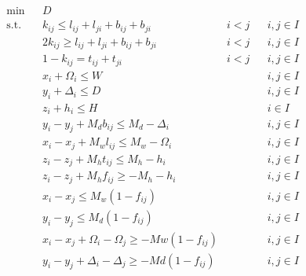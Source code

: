 \begin{align}
	& \underset{}{\text{min}}
	& & D \\
	  & \text{s.t.} &   & k_{ij} \leq l_{ij} + l_{ji} + b_{ij} + b_{ji}                                & i < j    &   & i,j \in I \label{equa53} \\
	  &             &   & 2 k_{ij} \geq l_{ij} + l_{ji} + b_{ij} + b_{ji}                              & i < j    &   & i,j \in I \label{equa54} \\
	  &             &   & 1 - k_{ij} = t_{ij} + t_{ji}                                                 & i < j    &   & i,j \in I \label{equa55} \\
	  &             &   & x_i + \Omega_i \leq W                                                        &          &   & i,j \in I \label{equa56} \\
	  &             &   & y_i + \Delta_i \leq D                                                        &          &   & i,j \in I \label{equa57} \\
	  &             &   & z_i + h_i \leq H                                                             &          &   & i \in I \label{equa58}   \\	
	  &             &   & y_i - y_j + M_d b_{ij} \leq M_d - \Delta_i                                   &          &   & i,j \in I \label{equa59} \\
	  &             &   & x_i - x_j + M_w l_{ij} \leq M_w - \Omega_i                                   &          &   & i,j \in I \label{equa60} \\
	  &             &   & z_i - z_j + M_h t_{ij} \leq M_h - h_i                                        &          &   & i,j \in I \label{equa61} \\
	  &             &   & z_i - z_j + M_h f_{ij} \geq - M_h - h_i                                      &          &   & i,j \in I \label{equa62} \\
	  &             &   & x_i - x_j \leq M_w (1-f_{ij})                                                &          &   & i,j \in I \label{equa63} \\
	  &             &   & y_i - y_j \leq M_d (1-f_{ij})                                                &          &   & i,j \in I \label{equa64} \\
	  &             &   & x_i - x_j + \Omega_i - \Omega_j \geq - Mw(1 - f_{ij})                        &          &   & i,j \in I\label{equa65}  \\
	  &             &   & y_i - y_j + \Delta_i - \Delta_j \geq - Md(1 - f_{ij})                        &          &   & i,j \in I\label{equa66}  \\

\end{align}
